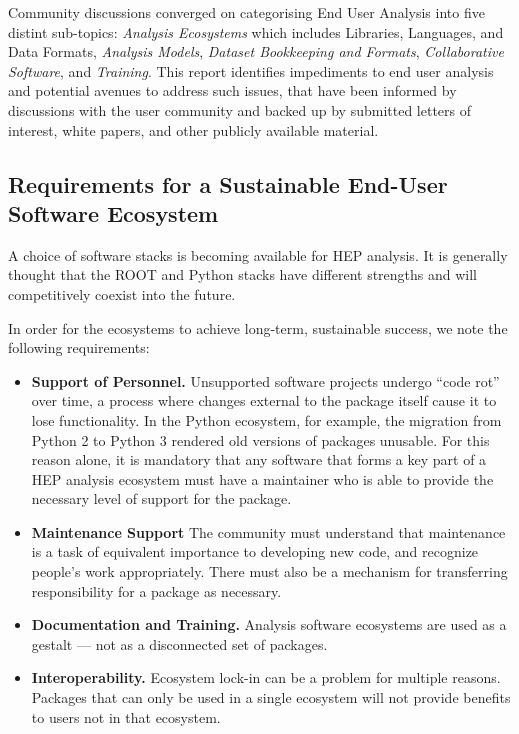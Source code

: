 Community discussions converged on categorising End User Analysis into five distint sub-topics: \textit{Analysis Ecosystems} which includes Libraries, Languages, and Data Formats, \textit{Analysis Models}, \textit{Dataset Bookkeeping and Formats}, \textit{Collaborative Software}, and \textit{Training}.
This report identifies impediments to end user analysis and potential avenues to address such issues, that have been informed by discussions with the user community and backed up by submitted letters of interest, white papers, and other publicly available material.


\subsection{Requirements for a Sustainable End-User Software Ecosystem}
A choice of software stacks is becoming available for HEP analysis. It is generally thought that the ROOT and Python stacks have different strengths and will competitively coexist into the future.

In order for the ecosystems to achieve long-term, sustainable success, we note the following requirements:
\begin{itemize}
    \item \textbf{Support of Personnel.} Unsupported software projects undergo ``code rot'' over time, a process where changes external to the package itself cause it to lose functionality. In the Python ecosystem, for example, the migration from Python 2 to Python 3 rendered old versions of packages unusable. For this reason alone, it is mandatory that any software that forms a key part of a HEP analysis ecosystem must have a maintainer who is able to provide the necessary level of support for the package. 
    \item \textbf{Maintenance Support} The community must understand that maintenance is a task of equivalent importance to developing new code, and recognize people's work appropriately. There must also be a mechanism for transferring responsibility for a package as necessary.
    \item \textbf{Documentation and Training.} Analysis software ecosystems are used as a gestalt --- not as a disconnected set of packages. 
    \item \textbf{Interoperability.} Ecosystem lock-in can be a problem for multiple reasons. Packages that can only be used in a single ecosystem will not provide benefits to users not in that ecosystem. 
\end{itemize}

